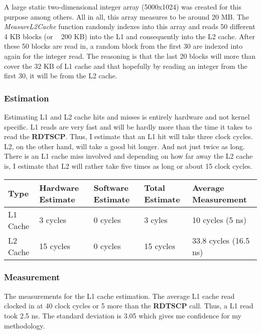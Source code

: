 \documentclass[paper=a4, fontsize=11pt]{scrartcl}
\numberwithin{equation}{section}        %
\numberwithin{figure}{section}          %
\numberwithin{table}{section}               %
\begin{document}
A large static two-dimensional integer array (5000x1024) was created for this purpose among others.  All in all, this array measures to be around 20 MB. The \textit{MeasureL2Cache} function randomly indexes into this array and reads 50 different 4 KB blocks (or ~ 200 KB) into the L1 and consequently into the L2 cache.  After these 50 blocks are read in, a random block from the first 30 are indexed into again for the integer read.  The reasoning is that the last 20 blocks will more than cover the 32 KB of L1 cache and that hopefully by reading an integer from the first 30, it will be from the L2 cache. 

\subsubsection{Estimation}

Estimating L1 and L2 cache hits and misses is entirely hardware and not kernel specific.  L1 reads are very fast and will be hardly more than the time it takes to read the \textbf{RDTSCP}.  Thus, I estimate that an L1 hit will take three clock cycles.  L2, on the other hand, will take a good bit longer.  And not just twice as long.  There is an L1 cache miss involved and depending on how far away the L2 cache is, I estimate that L2 will rather take five times as long or about 15 clock cycles.

\begin{center}
    \begin{tabular}{ | l | l | l | l | l |}
    \hline
    Type & Hardware Estimate & Software Estimate & Total Estimate & Average Measurement \\      \hline
    L1 Cache & 3 cycles & 0 cycles & 3 cyles & 10 cycles (5 ns) \\ 
    L2 Cache & 15 cycles & 0 cycles & 15 cycles & 33.8 cycles (16.5 ns) \\
    \hline
    \end{tabular}
\end{center}

\subsubsection{Measurement}

The measurements for the L1 cache estimation.  The average L1 cache read clocked in at 40 clock cycles or 5 more than the \textbf{RDTSCP} call.   Thus, a L1 read took 2.5 ns.  The standard deviation is 3.05 which gives me confidence for my methodology.
\end{document}
